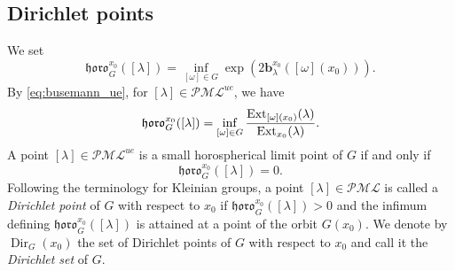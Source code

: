 \documentclass[dvipdfmx]{amsart}
\newtheorem{proposition}{Proposition}[section]
\theoremstyle{remark}
\newcommand{\ext}{{\rm Ext}}
\newcommand{\teich}{\mathcal{T}}
\newcommand{\mcg}{\operatorname{MCG}}
\newcommand{\ml}{\mathcal{ML}}
\newcommand{\pml}{\mathcal{PML}}
\newcommand{\hypell}{\operatorname{\mathbf{h\ell}}}
\newcommand{\busemann}{\boldsymbol{b}}
\newcommand{\horo}{\mathfrak{horo}}
\begin{document}
\subsection{Dirichlet points}
We set
\begin{equation}
\label{eq:horo_definition3}
\horo^{x_0}_G([\lambda])
=
\inf_{[\omega]\in G}
\exp\left(2\busemann^{x_0}_\lambda([\omega](x_0))\right).
\end{equation}
By \eqref{eq:busemann_ue}, for $[\lambda]\in\pml^{ue}$, we have
\begin{equation}
\label{eq:horo_definition4}
\horo^{x_0}_G([\lambda])
=
\inf_{[\omega]\in G}
\frac{\ext_{[\omega](x_0)}(\lambda)}
{\ext_{x_0}(\lambda)}.
\end{equation}
A point $[\lambda]\in\pml^{ue}$ is a small horospherical limit point of $G$ if and only if
\begin{equation}
\label{eq:horo_definition2}
\horo^{x_0}_G([\lambda])=0.
\end{equation}
Following the terminology for Kleinian groups, a point $[\lambda]\in\pml$ is called a \emph{Dirichlet point} of $G$ with respect to $x_0$ if $\horo^{x_0}_G([\lambda])>0$ and the infimum defining $\horo^{x_0}_G([\lambda])$ is attained at a point of the orbit $G(x_0)$. 
We denote by $\operatorname{Dir}_G(x_0)$ the set of Dirichlet points of $G$ with respect to $x_0$ and call it the \emph{Dirichlet set} of $G$.


\end{document}
